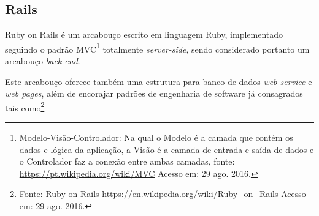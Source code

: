 \subsection{Rails}

\par Ruby on Rails é um arcabouço escrito em linguagem Ruby, implementado seguindo o padrão MVC\footnote{Modelo-Visão-Controlador: Na qual o Modelo é a camada que contém os dados e lógica da aplicação, a Visão é a camada de entrada e saída de dados e o Controlador faz a conexão entre ambas camadas, fonte: \url{https://pt.wikipedia.org/wiki/MVC} Acesso em: 29 ago. 2016.} totalmente \emph{server-side}, sendo considerado portanto um arcabouço \emph{back-end}.
\par Este arcabouço oferece também uma estrutura para banco de dados \emph{web service} e \emph{web pages}, além de encorajar padrões de engenharia de software já consagrados tais como\footnote{Fonte: Ruby on Rails \url{https://en.wikipedia.org/wiki/Ruby_on_Rails} Acesso em: 29 ago. 2016.}
